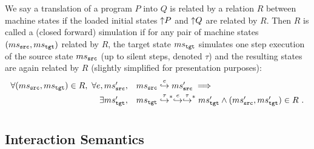 We say a translation of a program $P$ into $Q$ is related by a
relation $R$ between machine states if the loaded initial states
${\uparrow}{P}$ and ${\uparrow}{Q}$ are related by $R$.
Then $R$ is called a (closed forward) simulation if for any
pair of machine states $(ms{}_{\texttt{src}{}},ms{}_{\texttt{tgt}{}})$ related by $R$, the target state $ms{}_{\texttt{tgt}{}}$ simulates one step
execution of the source state $ms{}_{\texttt{src}{}}$ (up to silent steps, denoted $\tau$) and the resulting
states are again related by $R$ (slightly simplified for presentation purposes):
\[
\begin{array}{r@{\ \ }l}
  \forall (\mssrc, \mstgt) \in R,~ \forall e, \mssrc',~&
  \mssrc \estep{e} \mssrc' \implies {}\\[1mm]
  \exists \mstgt',~&
  \mstgt \estep{\tau}^{\raisebox{-1mm}{\scriptsize$\ast$}} \estep{e}\estep{\tau}^{\raisebox{-1mm}{\scriptsize$\ast$}} \mstgt' \land (\mssrc', \mstgt') \in R~.
\end{array}
\]
















\section{\ccc{}}

\subsection{Interaction Semantics}

